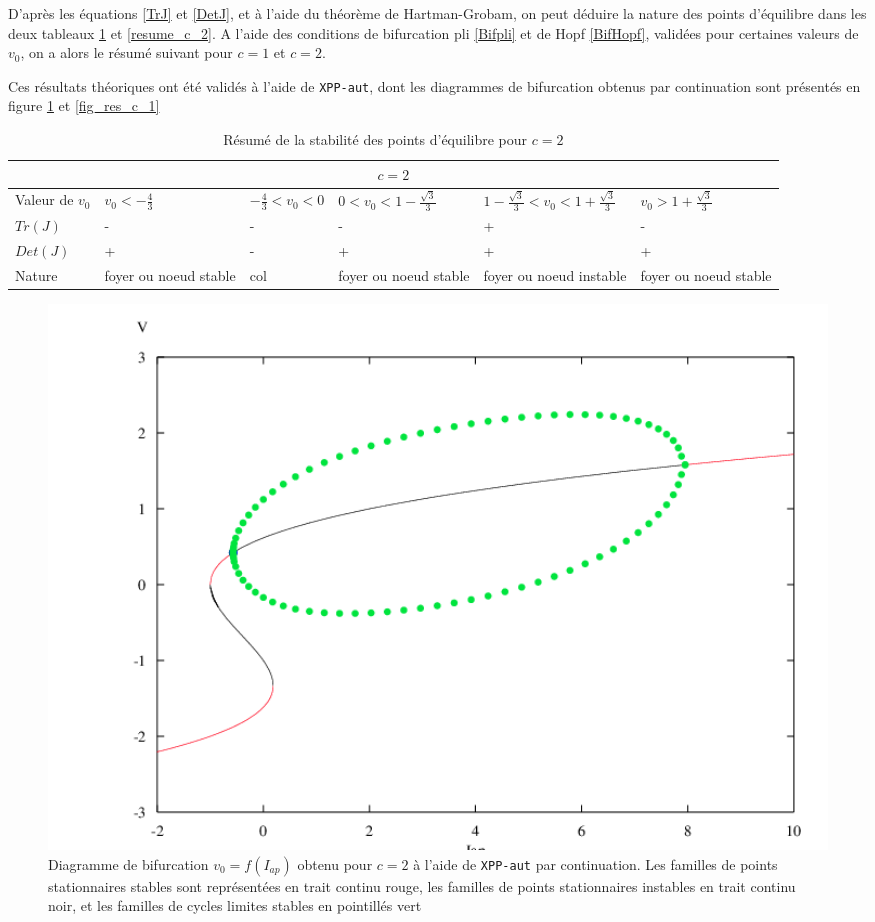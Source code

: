 \documentclass[12pt,a4paper,onecolumn]{article}
\begin{document}
D'après les équations \ref{TrJ} et \ref{DetJ}, et à l'aide du théorème de Hartman-Grobam, on peut déduire la nature des points d'équilibre dans les deux tableaux \ref{resume_c_1} et \ref{resume_c_2}.
A l'aide des conditions de bifurcation pli \ref{Bifpli} et de Hopf \ref{BifHopf}, validées pour certaines valeurs de $v_0$, on a alors le résumé suivant pour $c=1$ et $c=2$.

Ces résultats théoriques ont été validés à l'aide de \texttt{XPP-aut}, dont les diagrammes de bifurcation obtenus par continuation sont présentés en figure \ref{fig_res_c_2} et \ref{fig_res_c_1}

\newpage

\begin{table}[H]
\begin{tabular}{|L{2.2cm} | C{2cm} | C{2.5cm} | C{2.5cm} |C{2.5cm}|C{2.5cm}|}
\hline
{}
\\\hline
Valeur de $v_0$ & $v_0 < - \frac{4}{3}$ & $- \frac{4}{3} < v_0 < 0$ & $0 < v_0 < 1 - \frac{\sqrt{3}}{3}$ & $1 - \frac{\sqrt{3}}{3} < v_0 < 1 + \frac{\sqrt{3}}{3}$ &$v_0 > 1 + \frac{\sqrt{3}}{3}$ \\
 \hline
$Tr(J)$ & - & - & - & + & - \\ \hline
$Det(J)$ & + & - & + & + &+ \\ \hline
Nature & foyer ou noeud stable  & col & foyer ou noeud stable & foyer ou noeud instable & foyer ou noeud stable \\ \hline
\end{tabular}
\caption{Résumé de la stabilité des points d'équilibre pour $c = 2$}
\label{resume_c_1}
\end{table}

\begin{figure}[H]
\begin{center}
\includegraphics[width = 1.0\textwidth]{bif_20.png}
\end{center}
\caption{Diagramme de bifurcation $v_0=f(I_{ap})$ obtenu pour $c=2$ à l'aide de \texttt{XPP-aut} par continuation. Les familles de points stationnaires stables sont représentées en trait continu rouge, les familles de points stationnaires instables en trait continu noir, et les familles de cycles limites stables en pointillés vert}
\label{fig_res_c_2}
\end{figure}
\end{document}
